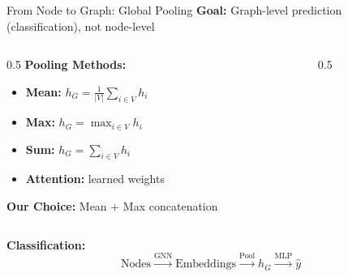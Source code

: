 \documentclass[aspectratio=169]{beamer}
\begin{document}
\begin{frame}{From Node to Graph: Global Pooling}
    \textbf{Goal:} Graph-level prediction (classification), not node-level
    
    \vspace{0.5em}
    \begin{columns}
        \begin{column}{0.5\textwidth}
            \textbf{Pooling Methods:}
            \begin{itemize}
                \item \textbf{Mean:} $h_G = \frac{1}{|V|}\sum_{i \in V} h_i$
                \item \textbf{Max:} $h_G = \max_{i \in V} h_i$
                \item \textbf{Sum:} $h_G = \sum_{i \in V} h_i$
                \item \textbf{Attention:} learned weights
            \end{itemize}
            
            \vspace{0.5em}
            \textbf{Our Choice:} Mean + Max concatenation
        \end{column}
        \begin{column}{0.5\textwidth}
            \begin{center}
            \end{center}
        \end{column}
    \end{columns}
    
    \vspace{0.5em}
    \textbf{Classification:}
    \begin{equation*}
        \text{Nodes} \xrightarrow{\text{GNN}} \text{Embeddings} \xrightarrow{\text{Pool}} h_G \xrightarrow{\text{MLP}} \hat{y}
    \end{equation*}
\end{frame}
\end{document}
